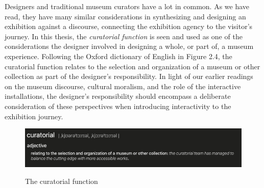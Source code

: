 Designers and traditional museum curators have a lot in common. As we have read, they have many similar considerations in synthesizing and designing an exhibition against a discourse, connecting the exhibition agency to the visitor's journey. In this thesis, the \emph{curatorial function} is seen and used as one of the considerations the designer involved in designing a whole, or part of, a museum experience. Following the Oxford dictionary of English in Figure 2.4, the curatorial function relates to the selection and organization of a museum or other collection as part of the designer's responsibility. In light of our earlier readings on the museum discourse, cultural moralism, and the role of the interactive installations, the designer's responsibility should encompass a deliberate consideration of these perspectives when introducing interactivity to the exhibition journey.

\begin{figure}[H]
\centering
\includegraphics[width=12.5cm]{pictures/background/curatorial.png}
\caption{The curatorial function}{\autocite{Oxford_dictionary}}
\end{figure}


